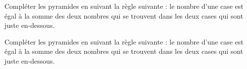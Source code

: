 \begin{exercice}
    Compléter les pyramides en suivant la règle suivante : le nombre d’une case est égal à la somme
    des deux nombres qui se trouvent dans les deux cases qui sont juste en-dessous.
    \begin{center}

    \end{center}

 \end{exercice}
\begin{corrige}
    Compléter les pyramides en suivant la règle suivante : le nombre d’une case est égal à la somme
    des deux nombres qui se trouvent dans les deux cases qui sont juste en-dessous.
    \begin{center}

    \end{center}

\end{corrige}
